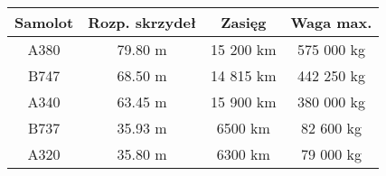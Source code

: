 \begin{center}
    \begin{tabular}{c|c|c|c}
         Samolot&Rozp. skrzydeł&Zasięg&Waga max.  \\
         \hline
         A380& 79.80 m&15 200 km&575 000 kg\\
         B747&68.50 m&14 815 km&442 250 kg\\
         A340&63.45 m&15 900 km& 380 000 kg\\
         B737&35.93 m&6500 km&82 600 kg\\
         A320&35.80 m&6300 km&79 000 kg
    \end{tabular}
\end{center}